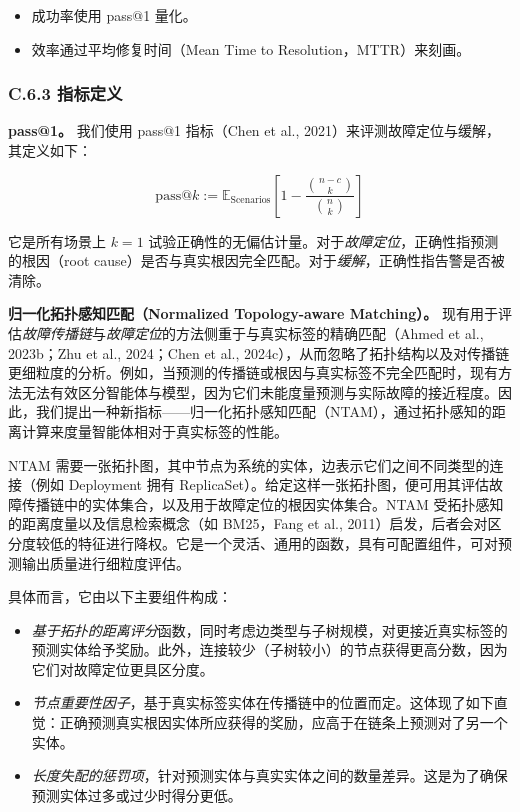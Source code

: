 \documentclass[10pt,UTF8,fontset=fandol]{ctexart}
\begin{document}
\begin{itemize}
\item 成功率使用 pass@1 量化。
\item 效率通过平均修复时间（Mean Time to Resolution，MTTR）来刻画。
\end{itemize}

\subsubsection{C.6.3 指标定义}

\textbf{pass@1。} 我们使用 pass@1 指标（Chen et al., 2021）来评测故障定位与缓解，其定义如下：

\begin{equation}
\mathrm{pass@}k := \mathbb{E}_{\mathrm{Scenarios}}\left[ 1 - \frac{\binom{n-c}{k}}{\binom{n}{k}} \right]
\end{equation}

它是所有场景上 $k=1$ 试验正确性的无偏估计量。对于\emph{故障定位}，正确性指预测的根因（root cause）是否与真实根因完全匹配。对于\emph{缓解}，正确性指告警是否被清除。

\textbf{归一化拓扑感知匹配（Normalized Topology-aware Matching）。} 现有用于评估\emph{故障传播链}与\emph{故障定位}的方法侧重于与真实标签的精确匹配（Ahmed et al., 2023b；Zhu et al., 2024；Chen et al., 2024c），从而忽略了拓扑结构以及对传播链更细粒度的分析。例如，当预测的传播链或根因与真实标签不完全匹配时，现有方法无法有效区分智能体与模型，因为它们未能度量预测与实际故障的接近程度。因此，我们提出一种新指标——归一化拓扑感知匹配（NTAM），通过拓扑感知的距离计算来度量智能体相对于真实标签的性能。

NTAM 需要一张拓扑图，其中节点为系统的实体，边表示它们之间不同类型的连接（例如 Deployment 拥有 ReplicaSet）。给定这样一张拓扑图，便可用其评估故障传播链中的实体集合，以及用于故障定位的根因实体集合。NTAM 受拓扑感知的距离度量以及信息检索概念（如 BM25，Fang et al., 2011）启发，后者会对区分度较低的特征进行降权。它是一个灵活、通用的函数，具有可配置组件，可对预测输出质量进行细粒度评估。

具体而言，它由以下主要组件构成：

\begin{itemize}
\item \emph{基于拓扑的距离评分}函数，同时考虑边类型与子树规模，对更接近真实标签的预测实体给予奖励。此外，连接较少（子树较小）的节点获得更高分数，因为它们对故障定位更具区分度。
\item \emph{节点重要性因子}，基于真实标签实体在传播链中的位置而定。这体现了如下直觉：正确预测真实根因实体所应获得的奖励，应高于在链条上预测对了另一个实体。
\item \emph{长度失配的惩罚项}，针对预测实体与真实实体之间的数量差异。这是为了确保预测实体过多或过少时得分更低。
\end{itemize}
\end{document}
